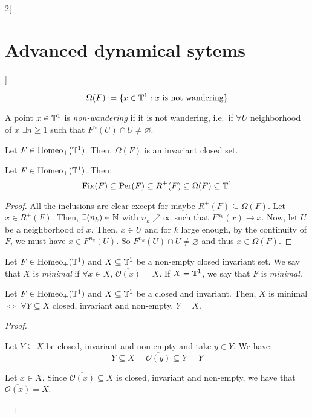 \documentclass[../../../main_math.tex]{subfiles}
\begin{document}
\begin{multicols}{2}[\section{Advanced dynamical sytems}]
\begin{definition}
    $$
      \Omega(F):=\{ x\in\mathbb{T}^1: x\text{ is not wandering}\}
    $$
  \end{definition}
  \begin{remark}
    A point $x\in\mathbb{T}^1$ is \emph{non-wandering} if it is not wandering, i.e.\ if $\forall U$ neighborhood of $x$ $\exists n\geq 1$ such that $F^n(U)\cap U\ne\varnothing$.
  \end{remark}
  \begin{proposition}
    Let $F\in \mathrm{Homeo}_+(\mathbb{T}^1)$. Then, $\Omega(F)$ is an invariant closed set.
  \end{proposition}
  \begin{lemma}
    Let $F \in \mathrm{Homeo}_+(\mathbb{T}^1)$. Then:
    $$
      \mathrm{Fix}(F)\subseteq \operatorname{Per}(F)\subseteq R^\pm(F)\subseteq \Omega(F)\subseteq \mathbb{T}^1
    $$
  \end{lemma}
  \begin{proof}
    All the inclusions are clear except for maybe $R^\pm(F)\subseteq \Omega(F)$. Let $x\in R^\pm(F)$. Then, $\exists (n_k)\in\mathbb{N}$ with $n_k \nearrow \infty$ such that $F^{n_k}(x)\to x$. Now, let $U$ be a neighborhood of $x$. Then, $x\in U$ and for $k$ large enough, by the continuity of $F$, we must have $x\in F^{n_k}(U)$. So $F^{n_k}(U)\cap U\ne\varnothing$ and thus $x\in \Omega(F)$.
  \end{proof}
  \begin{definition}
    Let $F\in \mathrm{Homeo}_+(\mathbb{T}^1)$ and $X\subseteq \mathbb{T}^1$ be a non-empty closed invariant set. We say that $X$ is \emph{minimal} if $\forall x\in X$, $\overline{\mathcal{O}(x)}=X$. If $X=\mathbb{T}^1$, we say that $F$ is \emph{minimal}.
  \end{definition}
  \begin{proposition}
    Let $F\in \mathrm{Homeo}_+(\mathbb{T}^1)$ and $X\subseteq \mathbb{T}^1$ be a closed and invariant. Then, $X$ is minimal $\iff$ $\forall Y\subseteq X$ closed, invariant and non-empty, $Y=X$.
  \end{proposition}
  \begin{proof}
    \begin{itemizeiff}
      Let $Y\subseteq X$ be closed, invariant and non-empty and take $y\in Y$. We have:
      $$Y\subseteq X = \overline{\mathcal{O}(y)}\subseteq \overline{Y}=Y$$
      \item Let $x\in X$. Since $\overline{\mathcal{O}(x)}\subseteq X$ is closed, invariant and non-empty, we have that $\overline{\mathcal{O}(x)}=X$.
    \end{itemizeiff}
  \end{proof}
  \begin{theorem}

\end{theorem}
\end{multicols}
\end{document}
